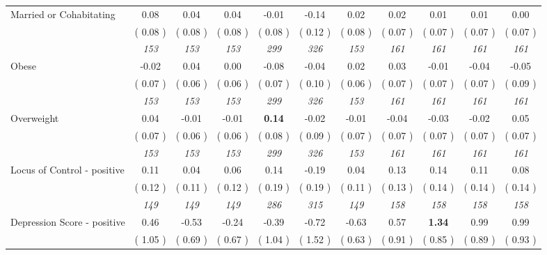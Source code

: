 \begin{tabular}{l c c c c c c c c c c}
Married or Cohabitating &      0.08 &      0.04 &      0.04 &     -0.01 &     -0.14 &      0.02 &      0.02 &      0.01 &      0.01 &      0.00 \\
& (     0.08 ) & (     0.08 ) & (     0.08 ) & (     0.08 ) & (     0.12 ) & (     0.08 ) & (     0.07 ) & (     0.07 ) & (     0.07 ) & (     0.07 ) \\
& \textit{ 153 } & \textit{ 153 } & \textit{ 153 } & \textit{ 299 } & \textit{ 326 } & \textit{ 153 } & \textit{ 161 } & \textit{ 161 } & \textit{ 161 } & \textit{ 161 } \\
Obese &     -0.02 &      0.04 &      0.00 &     -0.08 &     -0.04 &      0.02 &      0.03 &     -0.01 &     -0.04 &     -0.05 \\
& (     0.07 ) & (     0.06 ) & (     0.06 ) & (     0.07 ) & (     0.10 ) & (     0.06 ) & (     0.07 ) & (     0.07 ) & (     0.07 ) & (     0.09 ) \\
& \textit{ 153 } & \textit{ 153 } & \textit{ 153 } & \textit{ 299 } & \textit{ 326 } & \textit{ 153 } & \textit{ 161 } & \textit{ 161 } & \textit{ 161 } & \textit{ 161 } \\
Overweight &      0.04 &     -0.01 &     -0.01 & \textbf{      0.14 } &     -0.02 &     -0.01 &     -0.04 &     -0.03 &     -0.02 &      0.05 \\
& (     0.07 ) & (     0.06 ) & (     0.06 ) & (     0.08 ) & (     0.09 ) & (     0.07 ) & (     0.07 ) & (     0.07 ) & (     0.07 ) & (     0.07 ) \\
& \textit{ 153 } & \textit{ 153 } & \textit{ 153 } & \textit{ 299 } & \textit{ 326 } & \textit{ 153 } & \textit{ 161 } & \textit{ 161 } & \textit{ 161 } & \textit{ 161 } \\
Locus of Control - positive &      0.11 &      0.04 &      0.06 &      0.14 &     -0.19 &      0.04 &      0.13 &      0.14 &      0.11 &      0.08 \\
& (     0.12 ) & (     0.11 ) & (     0.12 ) & (     0.19 ) & (     0.19 ) & (     0.11 ) & (     0.13 ) & (     0.14 ) & (     0.14 ) & (     0.14 ) \\
& \textit{ 149 } & \textit{ 149 } & \textit{ 149 } & \textit{ 286 } & \textit{ 315 } & \textit{ 149 } & \textit{ 158 } & \textit{ 158 } & \textit{ 158 } & \textit{ 158 } \\
Depression Score - positive &      0.46 &     -0.53 &     -0.24 &     -0.39 &     -0.72 &     -0.63 &      0.57 & \textbf{      1.34 } &      0.99 &      0.99 \\
& (     1.05 ) & (     0.69 ) & (     0.67 ) & (     1.04 ) & (     1.52 ) & (     0.63 ) & (     0.91 ) & (     0.85 ) & (     0.89 ) & (     0.93 ) \\

\end{tabular}
